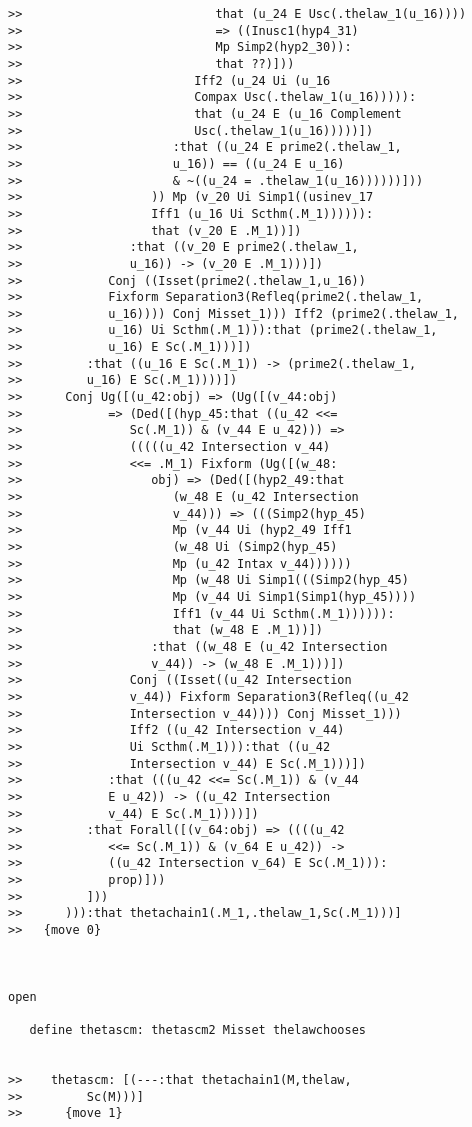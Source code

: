 \documentclass[12pt]{article}
\begin{document}
\begin{verbatim}
>>                           that (u_24 E Usc(.thelaw_1(u_16))))
>>                           => ((Inusc1(hyp4_31)
>>                           Mp Simp2(hyp2_30)):
>>                           that ??)]))
>>                        Iff2 (u_24 Ui (u_16
>>                        Compax Usc(.thelaw_1(u_16))))):
>>                        that (u_24 E (u_16 Complement
>>                        Usc(.thelaw_1(u_16)))))])
>>                     :that ((u_24 E prime2(.thelaw_1,
>>                     u_16)) == ((u_24 E u_16)
>>                     & ~((u_24 = .thelaw_1(u_16))))))]))
>>                  )) Mp (v_20 Ui Simp1((usinev_17
>>                  Iff1 (u_16 Ui Scthm(.M_1)))))):
>>                  that (v_20 E .M_1))])
>>               :that ((v_20 E prime2(.thelaw_1,
>>               u_16)) -> (v_20 E .M_1)))])
>>            Conj ((Isset(prime2(.thelaw_1,u_16))
>>            Fixform Separation3(Refleq(prime2(.thelaw_1,
>>            u_16)))) Conj Misset_1))) Iff2 (prime2(.thelaw_1,
>>            u_16) Ui Scthm(.M_1))):that (prime2(.thelaw_1,
>>            u_16) E Sc(.M_1)))])
>>         :that ((u_16 E Sc(.M_1)) -> (prime2(.thelaw_1,
>>         u_16) E Sc(.M_1))))])
>>      Conj Ug([(u_42:obj) => (Ug([(v_44:obj)
>>            => (Ded([(hyp_45:that ((u_42 <<=
>>               Sc(.M_1)) & (v_44 E u_42))) =>
>>               (((((u_42 Intersection v_44)
>>               <<= .M_1) Fixform (Ug([(w_48:
>>                  obj) => (Ded([(hyp2_49:that
>>                     (w_48 E (u_42 Intersection
>>                     v_44))) => (((Simp2(hyp_45)
>>                     Mp (v_44 Ui (hyp2_49 Iff1
>>                     (w_48 Ui (Simp2(hyp_45)
>>                     Mp (u_42 Intax v_44))))))
>>                     Mp (w_48 Ui Simp1(((Simp2(hyp_45)
>>                     Mp (v_44 Ui Simp1(Simp1(hyp_45))))
>>                     Iff1 (v_44 Ui Scthm(.M_1)))))):
>>                     that (w_48 E .M_1))])
>>                  :that ((w_48 E (u_42 Intersection
>>                  v_44)) -> (w_48 E .M_1)))])
>>               Conj ((Isset((u_42 Intersection
>>               v_44)) Fixform Separation3(Refleq((u_42
>>               Intersection v_44)))) Conj Misset_1)))
>>               Iff2 ((u_42 Intersection v_44)
>>               Ui Scthm(.M_1))):that ((u_42
>>               Intersection v_44) E Sc(.M_1)))])
>>            :that (((u_42 <<= Sc(.M_1)) & (v_44
>>            E u_42)) -> ((u_42 Intersection
>>            v_44) E Sc(.M_1))))])
>>         :that Forall([(v_64:obj) => ((((u_42
>>            <<= Sc(.M_1)) & (v_64 E u_42)) ->
>>            ((u_42 Intersection v_64) E Sc(.M_1))):
>>            prop)]))
>>         ]))
>>      ))):that thetachain1(.M_1,.thelaw_1,Sc(.M_1)))]
>>   {move 0}



open

   define thetascm: thetascm2 Misset thelawchooses


>>    thetascm: [(---:that thetachain1(M,thelaw,
>>         Sc(M)))]
>>      {move 1}


\end{verbatim}
\end{document}
